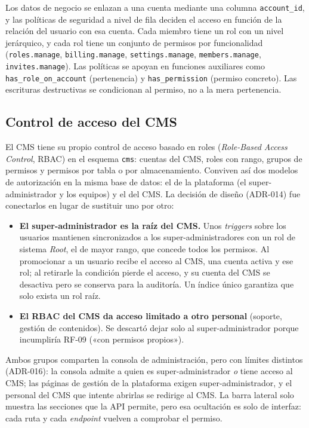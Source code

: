 Los datos de negocio se enlazan a una cuenta mediante una columna
\texttt{account\_id}, y las políticas de seguridad a nivel de fila deciden el
acceso en función de la relación del usuario con esa cuenta. Cada miembro
tiene un rol con un nivel jerárquico, y cada rol tiene un conjunto de
permisos por funcionalidad (\texttt{roles.manage}, \texttt{billing.manage},
\texttt{settings.manage}, \texttt{members.manage}, \texttt{invites.manage}).
Las políticas se apoyan en funciones auxiliares como
\texttt{has\_role\_on\_account} (pertenencia) y \texttt{has\_permission}
(permiso concreto). Las escrituras destructivas se condicionan al permiso, no
a la mera pertenencia.

\subsection{Control de acceso del CMS}

El CMS tiene su propio control de acceso basado en roles
(\textit{Role-Based Access Control}, RBAC) en el esquema \texttt{cms}: cuentas
del CMS, roles con rango, grupos de permisos y permisos por tabla o por
almacenamiento. Conviven así dos modelos de autorización en la misma base de
datos: el de la plataforma (el super-administrador y los equipos) y el del
CMS. La decisión de diseño (ADR-014) fue conectarlos en lugar de sustituir
uno por otro:

\begin{itemize}
  \item \textbf{El super-administrador es la raíz del CMS.} Unos
        \textit{triggers} sobre los usuarios mantienen sincronizados a los
        super-administradores con un rol de sistema \emph{Root}, el de mayor
        rango, que concede todos los permisos. Al promocionar a un usuario
        recibe el acceso al CMS, una cuenta activa y ese rol; al retirarle la
        condición pierde el acceso, y su cuenta del CMS se desactiva pero se
        conserva para la auditoría. Un índice único garantiza que solo exista
        un rol raíz.
  \item \textbf{El RBAC del CMS da acceso limitado a otro personal}
        (soporte, gestión de contenidos). Se descartó dejar solo al
        super-administrador porque incumpliría RF-09 («con permisos propios»).
\end{itemize}

Ambos grupos comparten la consola de administración, pero con límites
distintos (ADR-016): la consola admite a quien es super-administrador
\emph{o} tiene acceso al CMS; las páginas de gestión de la plataforma exigen
super-administrador, y el personal del CMS que intente abrirlas se redirige
al CMS. La barra lateral solo muestra las secciones que la API permite, pero
esa ocultación es solo de interfaz: cada ruta y cada \textit{endpoint} vuelven
a comprobar el permiso.

